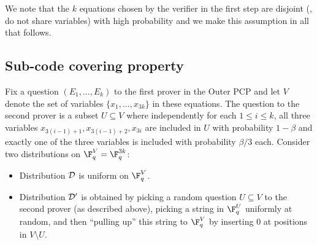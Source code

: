 We note that the $k$ equations chosen by the verifier in the first step are
disjoint (\ie, do not share variables)
with high probability and we make this assumption in all that follows.


\subsection{Sub-code covering property}

Fix a question $(E_1, \ldots, E_k)$ to the first prover in the Outer PCP and
let $V$ denote the set of variables $\{x_1,\ldots,x_{3k}\}$ in these equations.
The question to the second prover is a subset $U \subseteq V$ where independently
for each $1 \leq i \leq k$,
all three variables
$x_{3(i-1)+1}, x_{3(i-1)+2}, x_{3i}$ are included in $U$ with probability $1-\beta$ and
exactly one of the three variables is included with probability ${\beta}/{3}$ each.
Consider two
distributions on $\F_q^V = \F_q^{3k}$:
\begin{itemize}
\item Distribution ${\cal D}$ is uniform on $\F_q^{V}$.
\item Distribution ${\cal D'}$
%
%
%
is obtained by picking
a random question $U \subseteq V$ to the second prover (as described above),
picking a string
in $\F_q^U$ uniformly at random, and then ``pulling up'' this string to
$\F_q^V$ by inserting $0$ at positions in $V \setminus U$.
\end{itemize}

